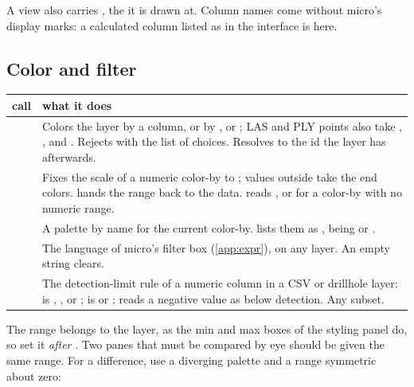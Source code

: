 A view also carries , the \code{[dx, dy, dz]} it is drawn at. Column names come
without micro's display marks: a calculated column listed as  in the interface is
 here.

\subsection{Color and filter}\label{sec:host-color}

\begin{tabularx}{\linewidth}{@{}>{\raggedright\arraybackslash}p{44mm}L@{}}
\toprule
call & what it does \\
\midrule
{} & Colors the layer by a column, or by ,
   or ; LAS and PLY points also take ,
  ,  and . Rejects with the list of choices.
  Resolves to the id the layer has afterwards. \\
 \newline {} & Fixes the scale of a numeric
  color-by to ; values outside take the end colors.  hands the
  range back to the data.  reads , or 
  for a color-by with no numeric range. \\
 \newline {} & A palette by name for the current
  color-by.  lists them as ,  being
   or . \\
 \newline {} & The language of micro's filter box
  (\cref{app:expr}), on any layer. An empty string clears. \\
 & The detection-limit rule of a numeric column in a
  CSV or drillhole layer:  is , ,  or
  ;  is  or ;  reads a
  negative value as below detection. Any subset. \\
\bottomrule
\end{tabularx}

The range belongs to the layer, as the min and max boxes of the styling panel do, so set it
\emph{after} . Two panes that must be compared by eye should be given the same
range. For a difference, use a diverging palette and a range symmetric about zero:


